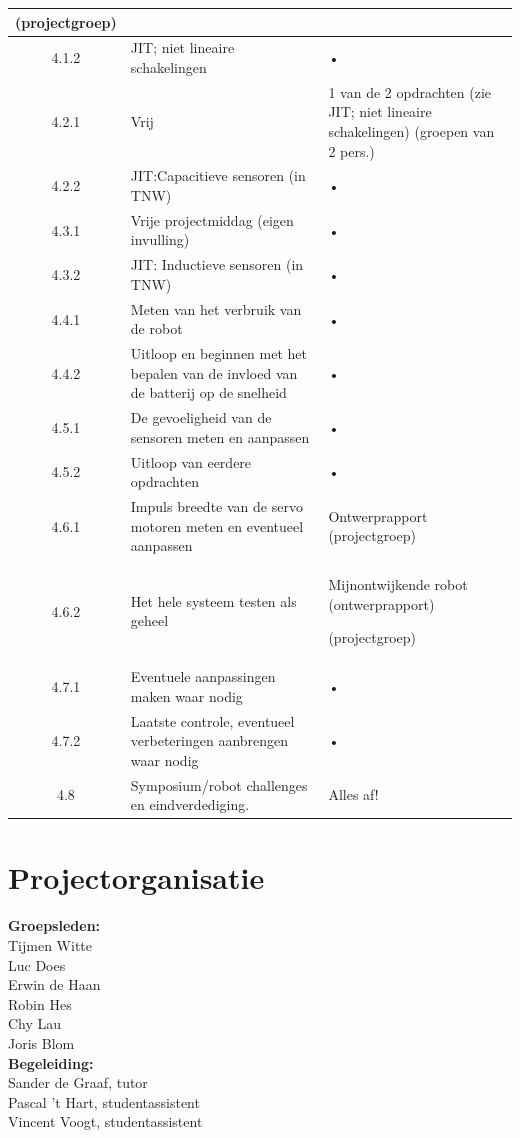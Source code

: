 \documentclass[11pt]{article}
\begin{document}
\begin{adjustbox}{width=\textwidth,totalheight=\textheight,keepaspectratio}
\begin{tabular}{|c|p{10cm}|p{8cm}|}
(projectgroep)
 \\
\hline
4.1.2 & JIT; niet lineaire schakelingen & • \\
\hline
4.2.1 & Vrij & 1 van de 2 opdrachten (zie JIT; niet lineaire schakelingen)
(groepen van 2 pers.)
 \\
\hline
4.2.2 & JIT:Capacitieve sensoren (in TNW) & • \\
\hline
4.3.1 & Vrije projectmiddag (eigen invulling) & • \\
\hline
4.3.2 & JIT: Inductieve sensoren (in TNW) & • \\
\hline
4.4.1 & Meten van het verbruik van de robot & • \\
\hline
4.4.2 & Uitloop en beginnen met het bepalen van de invloed van de batterij op de snelheid & • \\
\hline
4.5.1 & De gevoeligheid van de sensoren meten en aanpassen  & • \\
\hline
4.5.2 & Uitloop van eerdere opdrachten & • \\
\hline
4.6.1 & Impuls breedte van de servo motoren meten en eventueel aanpassen & Ontwerprapport (projectgroep)
 \\
\hline
4.6.2 & Het hele systeem testen als geheel & Mijnontwijkende robot (ontwerprapport) 

(projectgroep)
\\
\hline
4.7.1 & Eventuele aanpassingen maken waar nodig & • \\
\hline
4.7.2 & Laatste controle, eventueel verbeteringen aanbrengen waar nodig & • \\
\hline
4.8 & Symposium/robot challenges en eindverdediging. & Alles af! \\
\hline
\end{tabular}

\end{adjustbox}
 

\newpage
\section{Projectorganisatie}
\textbf{Groepsleden:}\\ 
Tijmen Witte\\ 
Luc Does\\ 
Erwin de Haan\\ 
Robin Hes\\ 
Chy Lau\\ 
Joris Blom\\

\noindent \textbf{Begeleiding:}\\
Sander de Graaf, tutor\\
Pascal 't Hart, studentassistent\\
Vincent Voogt, studentassistent\\
\end{document}
